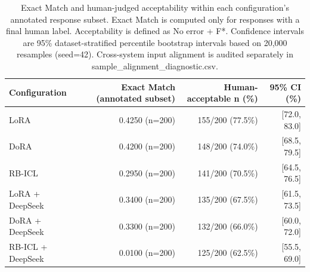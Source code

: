 \begin{table}[htbp]
\centering
\small
\begin{tabular}{lrrr}
\toprule
Configuration & Exact Match (annotated subset) & Human-acceptable n (\%) & 95\% CI (\%) \\
\midrule
LoRA & 0.4250 (n=200) & 155/200 (77.5\%) & [72.0, 83.0] \\
DoRA & 0.4200 (n=200) & 148/200 (74.0\%) & [68.5, 79.5] \\
RB-ICL & 0.2950 (n=200) & 141/200 (70.5\%) & [64.5, 76.5] \\
LoRA + DeepSeek & 0.3400 (n=200) & 135/200 (67.5\%) & [61.5, 73.5] \\
DoRA + DeepSeek & 0.3300 (n=200) & 132/200 (66.0\%) & [60.0, 72.0] \\
RB-ICL + DeepSeek & 0.0100 (n=200) & 125/200 (62.5\%) & [55.5, 69.0] \\
\bottomrule
\end{tabular}
\caption{Exact Match and human-judged acceptability within each configuration's annotated response subset. Exact Match is computed only for responses with a final human label. Acceptability is defined as No error + F*. Confidence intervals are 95\% dataset-stratified percentile bootstrap intervals based on 20,000 resamples (seed=42). Cross-system input alignment is audited separately in sample\_alignment\_diagnostic.csv.}
\label{tab:human_acceptability}
\end{table}
